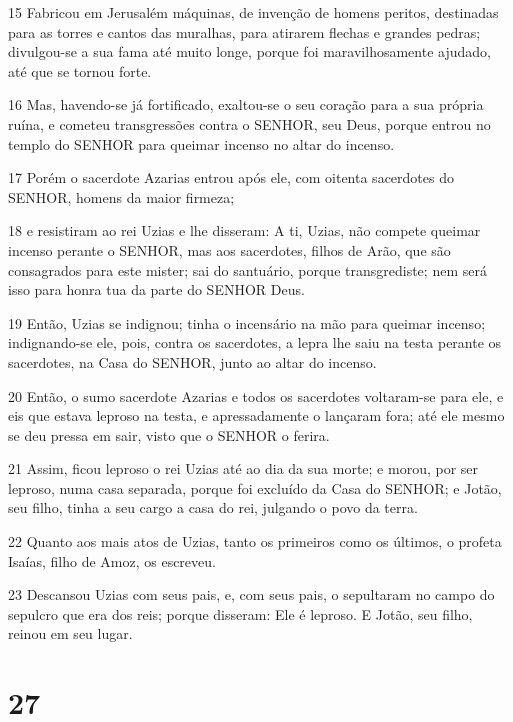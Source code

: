 \par 15 Fabricou em Jerusalém máquinas, de invenção de homens peritos, destinadas para as torres e cantos das muralhas, para atirarem flechas e grandes pedras; divulgou-se a sua fama até muito longe, porque foi maravilhosamente ajudado, até que se tornou forte.
\par 16 Mas, havendo-se já fortificado, exaltou-se o seu coração para a sua própria ruína, e cometeu transgressões contra o SENHOR, seu Deus, porque entrou no templo do SENHOR para queimar incenso no altar do incenso.
\par 17 Porém o sacerdote Azarias entrou após ele, com oitenta sacerdotes do SENHOR, homens da maior firmeza;
\par 18 e resistiram ao rei Uzias e lhe disseram: A ti, Uzias, não compete queimar incenso perante o SENHOR, mas aos sacerdotes, filhos de Arão, que são consagrados para este mister; sai do santuário, porque transgrediste; nem será isso para honra tua da parte do SENHOR Deus.
\par 19 Então, Uzias se indignou; tinha o incensário na mão para queimar incenso; indignando-se ele, pois, contra os sacerdotes, a lepra lhe saiu na testa perante os sacerdotes, na Casa do SENHOR, junto ao altar do incenso.
\par 20 Então, o sumo sacerdote Azarias e todos os sacerdotes voltaram-se para ele, e eis que estava leproso na testa, e apressadamente o lançaram fora; até ele mesmo se deu pressa em sair, visto que o SENHOR o ferira.
\par 21 Assim, ficou leproso o rei Uzias até ao dia da sua morte; e morou, por ser leproso, numa casa separada, porque foi excluído da Casa do SENHOR; e Jotão, seu filho, tinha a seu cargo a casa do rei, julgando o povo da terra.
\par 22 Quanto aos mais atos de Uzias, tanto os primeiros como os últimos, o profeta Isaías, filho de Amoz, os escreveu.
\par 23 Descansou Uzias com seus pais, e, com seus pais, o sepultaram no campo do sepulcro que era dos reis; porque disseram: Ele é leproso. E Jotão, seu filho, reinou em seu lugar.

\chapter{27}

